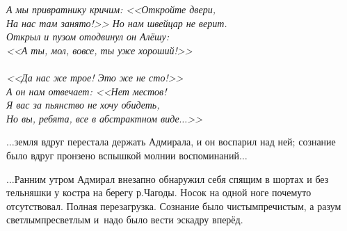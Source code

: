 \vspace{0.5cm}
\noindent\textit{%
	\hspace*{1.5cm}А мы привратнику кричим: <<Откройте двери, \\
	\hspace*{1.5cm}На нас там занято!>> Но нам швейцар не верит. \\
	\hspace*{1.5cm}Открыл и пузом отодвинул он Алёшу: \\
	\hspace*{1.5cm}<<А ты, мол, вовсе, ты уже хороший!>>\\
	\\
	\hspace*{1.5cm}<<Да нас же трое! Это же не сто!>>\\
	\hspace*{1.5cm}А он нам отвечает: <<Нет местов!\\
	\hspace*{1.5cm}Я вас за пьянство не хочу обидеть,\\
	\hspace*{1.5cm}Но вы, ребята, все в абстрактном виде$\ldots$>> 
}
\vspace{0.5cm}

$\ldots$земля вдруг перестала держать Адмирала, и он воспарил над ней; сознание было вдруг пронзено вспышкой молнии воспоминаний$\ldots$







$\ldots$Ранним утром Адмирал внезапно обнаружил себя спящим в шортах и без тельняшки у костра на берегу р.Чагоды. Носок на одной ноге почему\sdash то отсутствовал. Полная перезагрузка. Сознание было чистым\sdash пречистым, а разум светлым\sdash пресветлым и~надо было вести эскадру вперёд.

\begin{center}
\end{center}
